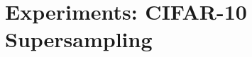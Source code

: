 \documentclass[letterpaper, 10 pt, conference]{ieeeconf}  %
\newcommand\extraspace{3pt}
\begin{document}

\section{Experiments: CIFAR-10 Supersampling}






\end{document}
